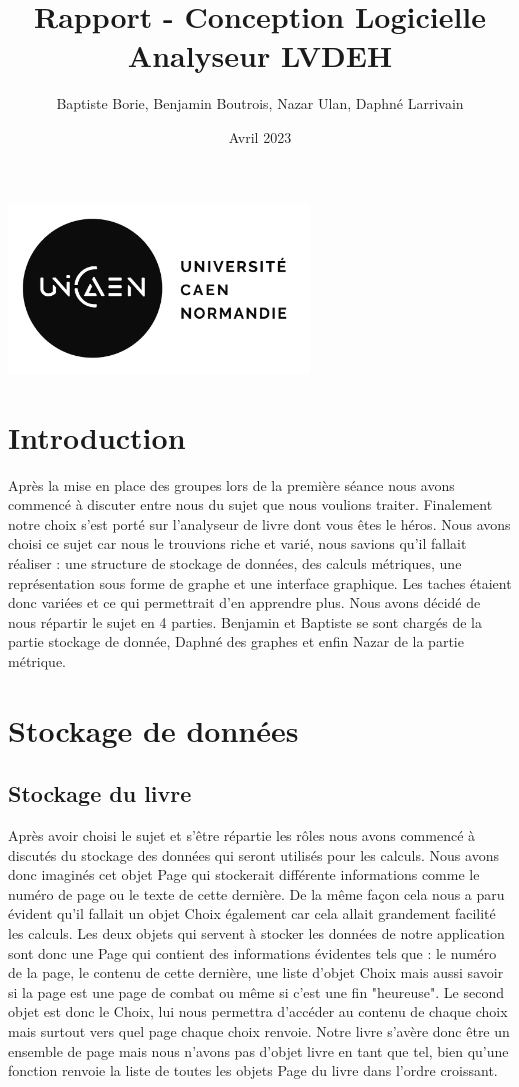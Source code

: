 \documentclass[a4paper,12pt]{article}
\title{Rapport - Conception Logicielle Analyseur LVDEH}
\author{Baptiste Borie, Benjamin Boutrois, Nazar Ulan, Daphné Larrivain}
\date{Avril 2023}
\begin{document}
\maketitle
\begin{center}
\includegraphics[width=0.6\textwidth]{unilogo.png}
\end{center}
\newpage
\tableofcontents
\newpage

\section{Introduction}
Après la mise en place des groupes lors de la première séance nous avons commencé à discuter entre nous du sujet que nous voulions traiter. Finalement notre choix s'est porté sur l'analyseur de livre dont vous êtes le héros. Nous avons choisi ce sujet car nous le trouvions riche et varié, nous savions qu'il fallait réaliser : une structure de stockage de données, des calculs métriques, une représentation sous forme de graphe et une interface graphique. Les taches étaient donc variées et ce qui permettrait d'en apprendre plus. 
Nous avons décidé de nous répartir le sujet en 4 parties. Benjamin et Baptiste se sont chargés de la partie stockage de donnée, Daphné des graphes et enfin Nazar de la partie métrique. 
\section{Stockage de données}
\subsection{Stockage du livre}
Après avoir choisi le sujet et s'être répartie les rôles nous avons commencé à discutés du stockage des données qui seront utilisés pour les calculs.
\newline
    Nous avons donc imaginés cet objet Page qui stockerait différente informations
comme le numéro de page ou le texte de cette dernière. De la même façon cela nous a paru évident qu'il fallait un objet Choix également car cela allait grandement facilité les calculs. Les deux objets qui servent à stocker les données de notre application sont donc une Page qui contient des informations évidentes tels que : le numéro de la page, le contenu de cette dernière, une liste d'objet Choix mais aussi savoir si la page est une page de combat ou même si c'est une fin "heureuse". Le second objet est donc le Choix, lui nous permettra d'accéder au contenu de chaque choix mais surtout vers quel page chaque choix renvoie.
\newline
    Notre livre s'avère donc être un ensemble de page mais nous n'avons pas
d'objet livre en tant que tel, bien qu'une fonction renvoie la liste de toutes les objets Page du livre dans l'ordre croissant. 
\end{document}
